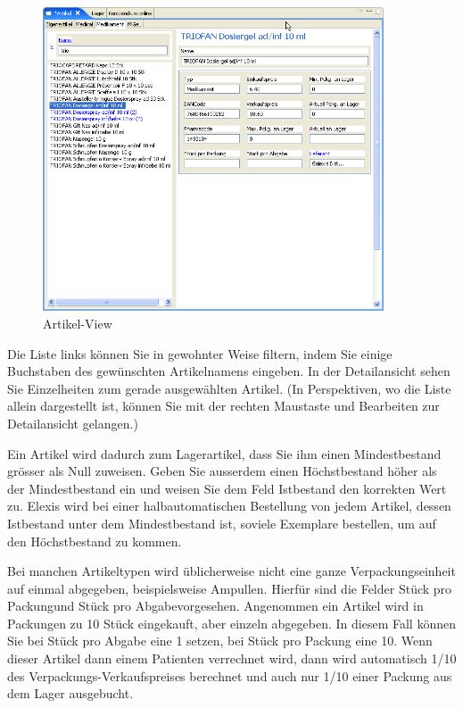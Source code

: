 \begin{figure}[htp]
\begin{center}
  \includegraphics[width=0.9\textwidth]{images/artikelview}
  \caption{Artikel-View}
  \label{fig:artikel}
\end{center}
\end{figure}
Die Liste links können Sie in gewohnter Weise filtern, indem Sie einige
Buchstaben des gewünschten Artikelnamens eingeben.
In der Detailansicht sehen Sie Einzelheiten zum gerade ausgewählten Artikel. (In
Perspektiven, wo die Liste allein dargestellt ist, können Sie mit der rechten
Maustaste und \glqq Bearbeiten\grqq{} zur Detailansicht gelangen.)


Ein Artikel wird dadurch zum Lagerartikel, dass Sie ihm einen Mindestbestand
grösser als Null zuweisen. Geben Sie ausserdem einen Höchstbestand höher als der
Mindestbestand ein und weisen Sie dem Feld \glqq Istbestand\grqq{} den korrekten
Wert zu. Elexis wird bei einer halbautomatischen Bestellung von jedem Artikel,
dessen Istbestand unter dem Mindestbestand ist, soviele Exemplare bestellen, um
auf den Höchstbestand zu kommen.

Bei manchen Artikeltypen wird üblicherweise nicht eine ganze Verpackungseinheit
auf einmal abgegeben, beispielsweise Ampullen. Hierfür sind die Felder \glqq
Stück pro Packung\grqq{}und \glqq Stück pro Abgabe\grqq{}vorgesehen. Angenommen
ein Artikel wird in Packungen zu 10 Stück eingekauft, aber einzeln abgegeben.
In diesem Fall können Sie bei Stück pro Abgabe eine 1 setzen, bei Stück pro
Packung eine 10. Wenn dieser Artikel dann einem Patienten verrechnet wird, dann
wird automatisch 1/10 des Verpackungs-Verkaufspreises berechnet und auch nur
1/10 einer Packung aus dem Lager ausgebucht.

